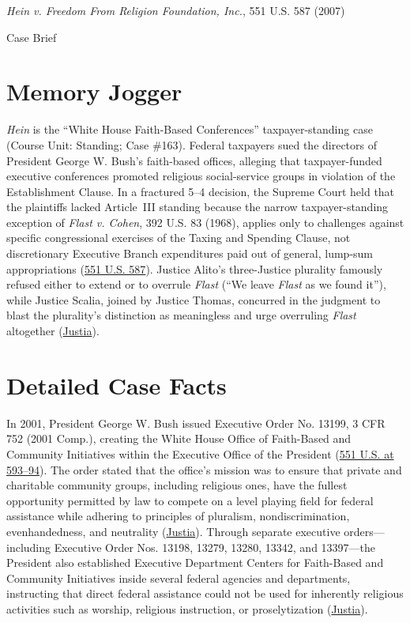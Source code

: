 \documentclass[12pt]{article}
\begin{document}
\begin{center}
{\LARGE \textit{Hein v. Freedom From Religion Foundation, Inc.}, 551 U.S. 587 (2007)\par}
\vspace{0.8em}
{\large Case Brief\par}
\end{center}
\vspace{1em}

\section{Memory Jogger}

\textit{Hein} is the ``White House Faith-Based Conferences'' taxpayer-standing case (Course Unit: Standing; Case \#163). Federal taxpayers sued the directors of President George W. Bush's faith-based offices, alleging that taxpayer-funded executive conferences promoted religious social-service groups in violation of the Establishment Clause. In a fractured 5--4 decision, the Supreme Court held that the plaintiffs lacked Article~III standing because the narrow taxpayer-standing exception of \textit{Flast v. Cohen}, 392 U.S. 83 (1968), applies only to challenges against specific congressional exercises of the Taxing and Spending Clause, not discretionary Executive Branch expenditures paid out of general, lump-sum appropriations (\href{https://supreme.justia.com/cases/federal/us/551/587/}{551 U.S. 587}). Justice Alito's three-Justice plurality famously refused either to extend or to overrule \textit{Flast} (``We leave \textit{Flast} as we found it''), while Justice Scalia, joined by Justice Thomas, concurred in the judgment to blast the plurality's distinction as meaningless and urge overruling \textit{Flast} altogether (\href{https://supreme.justia.com/cases/federal/us/551/587/}{Justia}).

\section{Detailed Case Facts}

In 2001, President George W. Bush issued Executive Order No. 13199, 3 CFR 752 (2001 Comp.), creating the White House Office of Faith-Based and Community Initiatives within the Executive Office of the President (\href{https://supreme.justia.com/cases/federal/us/551/587/}{551 U.S. at 593--94}). The order stated that the office's mission was to ensure that private and charitable community groups, including religious ones, have the fullest opportunity permitted by law to compete on a level playing field for federal assistance while adhering to principles of pluralism, nondiscrimination, evenhandedness, and neutrality (\href{https://supreme.justia.com/cases/federal/us/551/587/}{Justia}). Through separate executive orders---including Executive Order Nos. 13198, 13279, 13280, 13342, and 13397---the President also established Executive Department Centers for Faith-Based and Community Initiatives inside several federal agencies and departments, instructing that direct federal assistance could not be used for inherently religious activities such as worship, religious instruction, or proselytization (\href{https://supreme.justia.com/cases/federal/us/551/587/}{Justia}).
\end{document}
